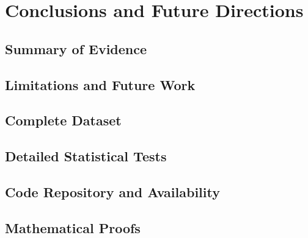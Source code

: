 \documentclass[12pt,oneside,a4paper]{book}
\begin{document}

\part{Conclusions and Future Directions}

\chapter{Summary of Evidence}


\chapter{Limitations and Future Work}



\appendix

\chapter{Complete Dataset}


\chapter{Detailed Statistical Tests}


\chapter{Code Repository and Availability}


\chapter{Mathematical Proofs}



\backmatter





\printindex
\end{document}
